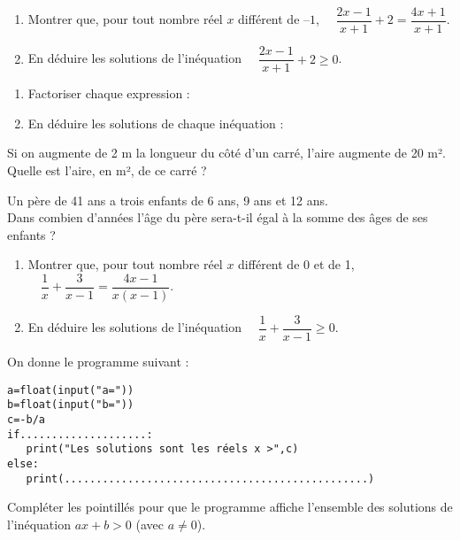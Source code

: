 \documentclass[a4paper,11pt,exos]{nsi} %
\begin{document}
\exo{}
\begin{enumerate}
	\item 	Montrer que, pour tout nombre réel $x$ différent de $–1$, $\quad \dfrac{2x-1}{x+1}+2=\dfrac{4x+1}{x+1}$.
	\item 	En déduire les solutions de l’inéquation $\quad \dfrac{2x-1}{x+1}+2 \geqslant 0$.
\end{enumerate}



\exo{}
\begin{enumerate}
	\item 	Factoriser chaque expression :
	\begin{multicols}{2}
	\end{multicols}
	\item 	En déduire les solutions de chaque inéquation :
		\begin{multicols}{2}
		\end{multicols}
\end{enumerate}


\exo{}
Si on augmente de 2 m la longueur du côté d’un carré, l’aire augmente de 20 m².\\
Quelle est l’aire, en m², de ce carré ?


\exo{}
Un père de 41 ans a trois enfants de 6 ans, 9 ans et 12 ans.\\
Dans combien d’années l’âge du père sera-t-il égal à la somme des âges de ses enfants ?


\exo{}
\begin{enumerate}
	\item 	Montrer que, pour tout nombre réel $x$ différent de 0 et de 1, $\quad \dfrac{1}{x}+\dfrac{3}{x-1}=\dfrac{4x-1}{x(x-1)}$.
	\item 	En déduire les solutions de l’inéquation $\quad \dfrac{1}{x}+\dfrac{3}{x-1} \geqslant 0$.	
\end{enumerate}




\exo{}

On donne le programme suivant :
\begin{pyc}
    \begin{verbatim}
a=float(input("a="))
b=float(input("b="))
c=-b/a
if....................:
   print("Les solutions sont les réels x >",c)
else:
   print(................................................)        
    \end{verbatim}
\end{pyc}
Compléter les pointillés pour que le programme affiche l’ensemble des solutions de l’inéquation $ax+b>0$ (avec $a\neq 0$).
\end{document}
